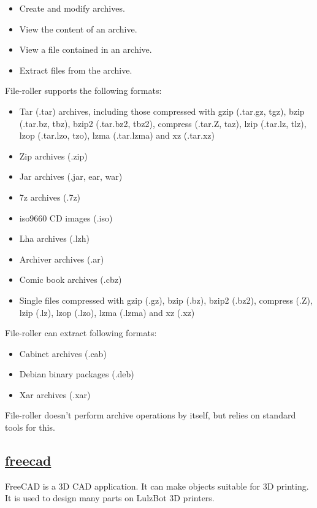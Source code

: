 \begin{itemize}
 \item Create and modify archives.
 \item View the content of an archive.
 \item View a file contained in an archive.
 \item Extract files from the archive.
\end{itemize}
 
 File-roller supports the following formats:

\begin{itemize}
 \item Tar (.tar) archives, including those compressed with
    gzip (.tar.gz, tgz), bzip (.tar.bz, tbz), bzip2 (.tar.bz2, tbz2),
    compress (.tar.Z, taz), lzip (.tar.lz, tlz), lzop (.tar.lzo, tzo),
    lzma (.tar.lzma) and xz (.tar.xz)
 \item Zip archives (.zip)
 \item Jar archives (.jar, ear, war)
 \item 7z archives (.7z)
 \item iso9660 CD images (.iso)
 \item Lha archives (.lzh)
 \item Archiver archives (.ar)
 \item Comic book archives (.cbz)
 \item Single files compressed with gzip (.gz), bzip (.bz), bzip2 (.bz2),
    compress (.Z), lzip (.lz), lzop (.lzo), lzma (.lzma) and xz (.xz)
\end{itemize}
 
 File-roller can extract following formats:

\begin{itemize}
 \item Cabinet archives (.cab)
 \item Debian binary packages (.deb)
 \item Xar archives (.xar)
\end{itemize}
 
 File-roller doesn't perform archive operations by itself, but relies on
 standard tools for this.

\subsection{\href{http://freecadweb.org/}{freecad}}

FreeCAD is a 3D CAD application.
It can make objects suitable for 3D printing. It is used to design many
parts on LulzBot 3D printers.

